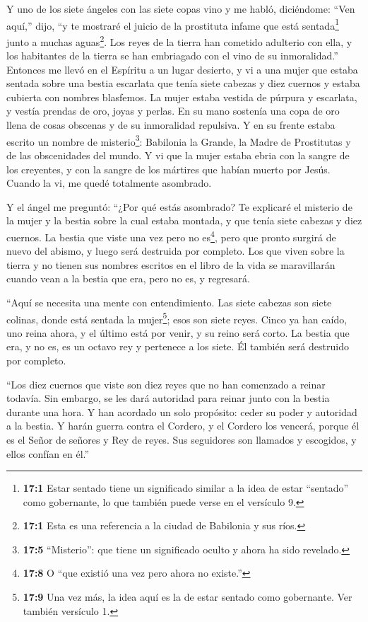  Y uno de los siete ángeles con las siete copas vino y me
habló, diciéndome: ``Ven aquí,'' dijo, ``y te mostraré el juicio de la
prostituta infame que está sentada\footnote{\textbf{17:1} Estar sentado
  tiene un significado similar a la idea de estar ``sentado'' como
  gobernante, lo que también puede verse en el versículo 9.} junto a
muchas aguas\footnote{\textbf{17:1} Esta es una referencia a la ciudad
  de Babilonia y sus ríos.}.  Los reyes de la tierra han
cometido adulterio con ella, y los habitantes de la tierra se han
embriagado con el vino de su inmoralidad.''  Entonces me
llevó en el Espíritu a un lugar desierto, y vi a una mujer que estaba
sentada sobre una bestia escarlata que tenía siete cabezas y diez
cuernos y estaba cubierta con nombres blasfemos.  La mujer
estaba vestida de púrpura y escarlata, y vestía prendas de oro, joyas y
perlas. En su mano sostenía una copa de oro llena de cosas obscenas y de
su inmoralidad repulsiva.  Y en su frente estaba escrito un
nombre de misterio\footnote{\textbf{17:5} ``Misterio'': que tiene un
  significado oculto y ahora ha sido revelado.}: Babilonia la Grande, la
Madre de Prostitutas y de las obscenidades del mundo.  Y vi
que la mujer estaba ebria con la sangre de los creyentes, y con la
sangre de los mártires que habían muerto por Jesús. Cuando la vi, me
quedé totalmente asombrado.

 Y el ángel me preguntó: ``¿Por qué estás asombrado? Te
explicaré el misterio de la mujer y la bestia sobre la cual estaba
montada, y que tenía siete cabezas y diez cuernos.  La
bestia que viste una vez pero no es\footnote{\textbf{17:8} O ``que
  existió una vez pero ahora no existe.''}, pero que pronto surgirá de
nuevo del abismo, y luego será destruida por completo. Los que viven
sobre la tierra y no tienen sus nombres escritos en el libro de la vida
se maravillarán cuando vean a la bestia que era, pero no es, y
regresará.

 ``Aquí se necesita una mente con entendimiento. Las siete
cabezas son siete colinas, donde está sentada la mujer\footnote{\textbf{17:9}
  Una vez más, la idea aquí es la de estar sentado como gobernante. Ver
  también versículo 1.};  esos son siete reyes. Cinco ya
han caído, uno reina ahora, y el último está por venir, y su reino será
corto.  La bestia que era, y no es, es un octavo rey y
pertenece a los siete. Él también será destruido por completo.

 ``Los diez cuernos que viste son diez reyes que no han
comenzado a reinar todavía. Sin embargo, se les dará autoridad para
reinar junto con la bestia durante una hora.  Y han
acordado un solo propósito: ceder su poder y autoridad a la bestia.
 Y harán guerra contra el Cordero, y el Cordero los
vencerá, porque él es el Señor de señores y Rey de reyes. Sus seguidores
son llamados y escogidos, y ellos confían en él.''


